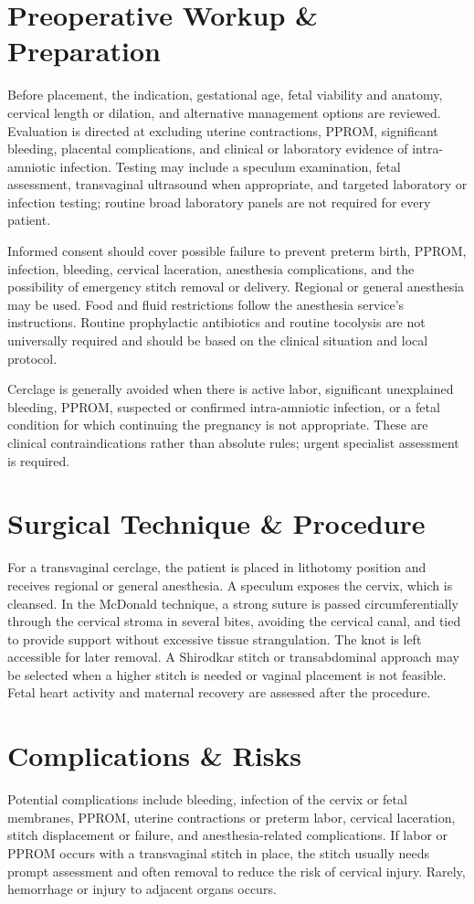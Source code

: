 \section*{Preoperative Workup \& Preparation}
Before placement, the indication, gestational age, fetal viability and anatomy, cervical length or dilation, and alternative management options are reviewed. Evaluation is directed at excluding uterine contractions, PPROM, significant bleeding, placental complications, and clinical or laboratory evidence of intra-amniotic infection. Testing may include a speculum examination, fetal assessment, transvaginal ultrasound when appropriate, and targeted laboratory or infection testing; routine broad laboratory panels are not required for every patient.

Informed consent should cover possible failure to prevent preterm birth, PPROM, infection, bleeding, cervical laceration, anesthesia complications, and the possibility of emergency stitch removal or delivery. Regional or general anesthesia may be used. Food and fluid restrictions follow the anesthesia service's instructions. Routine prophylactic antibiotics and routine tocolysis are not universally required and should be based on the clinical situation and local protocol.

Cerclage is generally avoided when there is active labor, significant unexplained bleeding, PPROM, suspected or confirmed intra-amniotic infection, or a fetal condition for which continuing the pregnancy is not appropriate. These are clinical contraindications rather than absolute rules; urgent specialist assessment is required.

\section*{Surgical Technique \& Procedure}
For a transvaginal cerclage, the patient is placed in lithotomy position and receives regional or general anesthesia. A speculum exposes the cervix, which is cleansed. In the McDonald technique, a strong suture is passed circumferentially through the cervical stroma in several bites, avoiding the cervical canal, and tied to provide support without excessive tissue strangulation. The knot is left accessible for later removal. A Shirodkar stitch or transabdominal approach may be selected when a higher stitch is needed or vaginal placement is not feasible. Fetal heart activity and maternal recovery are assessed after the procedure.

\section*{Complications \& Risks}
Potential complications include bleeding, infection of the cervix or fetal membranes, PPROM, uterine contractions or preterm labor, cervical laceration, stitch displacement or failure, and anesthesia-related complications. If labor or PPROM occurs with a transvaginal stitch in place, the stitch usually needs prompt assessment and often removal to reduce the risk of cervical injury. Rarely, hemorrhage or injury to adjacent organs occurs.

